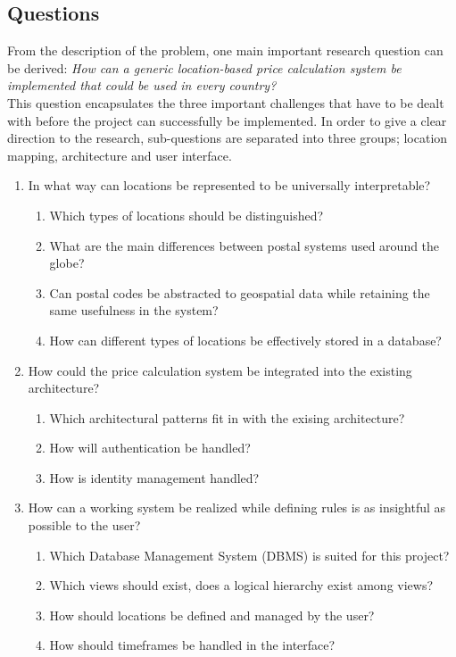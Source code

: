 \subsection{Questions}

From the description of the problem, one main important research question can be derived: \textit{How can a generic location-based price calculation system be implemented that could be used in every country?} \\

This question encapsulates the three important challenges that have to be dealt with before the project can successfully be implemented. In order to give a clear direction to the research, sub-questions are separated into three groups; location mapping, architecture and user interface.

\begin{enumerate}

	\item In what way can locations be represented to be universally interpretable?
	      \begin{enumerate}[label*=\arabic*.]
		      \item Which types of locations should be distinguished?
		      \item What are the main differences between postal systems used around the globe?
		      \item Can postal codes be abstracted to geospatial data while retaining the same usefulness in the system?
		      \item How can different types of locations be effectively stored in a database?
	      \end{enumerate}

	\item How could the price calculation system be integrated into the existing architecture?
	      \begin{enumerate}[label*=\arabic*.]
		      \item Which architectural patterns fit in with the exising architecture?
		      \item How will authentication be handled?
		      \item How is identity management handled?
	      \end{enumerate}

	\item How can a working system be realized while defining rules is as insightful as possible to the user?
	      \begin{enumerate}[label*=\arabic*.]
		      \item Which Database Management System (DBMS) is suited for this project?
		      \item Which views should exist, does a logical hierarchy exist among views?
		      \item How should locations be defined and managed by the user?
		      \item How should timeframes be handled in the interface?
	      \end{enumerate}

\end{enumerate}

